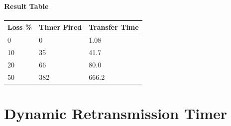 \documentclass[11pt]{article}
\begin{document}
\paragraph{Result Table}

\begin{tabular}{lll}
	\toprule
	Loss \% & Timer Fired & Transfer Time\\
	\midrule
	0 & 0 & 1.08\\
	10 & 35 & 41.7\\
	20 & 66 & 80.0\\
	50 & 382 & 666.2\\
	\bottomrule
\end{tabular}

\section{Dynamic Retransmission Timer}
\end{document}
